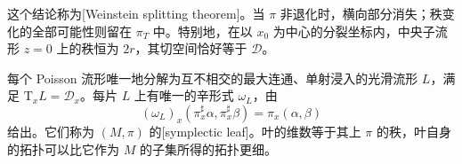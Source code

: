这个结论称为[Weinstein splitting theorem]。当 \(\pi\) 非退化时，横向部分消失；秩变化的全部可能性则留在 \(\pi_T\) 中。特别地，在以 \(x_0\) 为中心的分裂坐标内，中央子流形 \(z=0\) 上的秩恒为 \(2r\)，其切空间恰好等于 \(\mathcal D\)。

\begin{theorem}\label{g4:thm:0904:symplectic-leaves}
	每个 Poisson 流形唯一地分解为互不相交的最大连通、单射浸入的光滑流形 \(L\)，满足 \(\mathrm{T}_xL=\mathcal D_x\)。每片 \(L\) 上有唯一的辛形式 \(\omega_L\)，由
	\begin{equation}\label{g4:eq:0904:leaf-form}
		(\omega_L)_x(\pi_x^\sharp\alpha,\pi_x^\sharp\beta)
		=\pi_x(\alpha,\beta)
	\end{equation}
	给出。它们称为 \((M,\pi)\) 的[symplectic leaf]。叶的维数等于其上 \(\pi\) 的秩，叶自身的拓扑可以比它作为 \(M\) 的子集所得的拓扑更细。
\end{theorem}

